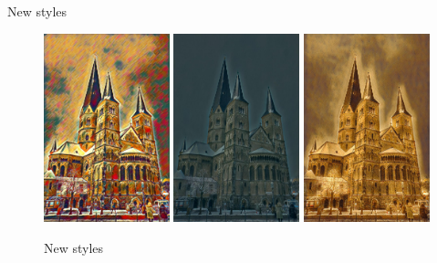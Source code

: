 \documentclass{beamer}
\begin{document}
    \begin{frame}{New styles}

        \begin{figure}
            \includegraphics[width=0.325\textwidth, height=0.6\textheight]{mu_compo}
            \hfill
            \includegraphics[width=0.325\textwidth, height=0.6\textheight]{mu_femme}
            \hfill
            \includegraphics[width=0.325\textwidth, height=0.6\textheight]{mu_bali}
            \caption{\label{fig:clutter}New styles}
        \end{figure}

    \end{frame}
\end{document}
